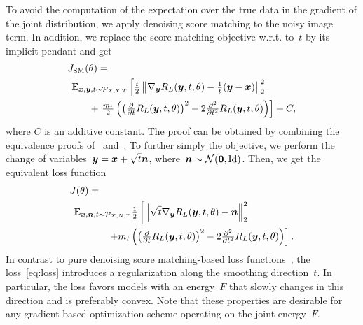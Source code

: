 \documentclass[nohyperref]{article}
\newcommand{\id}{\mathrm{Id}}
\newcommand{\norm}[1]{\left\Vert#1\right\Vert}
\renewcommand{\vec}[1]{\mathbf{#1}}
\newcommand{\dist}[1]{\mathcal{P}_{#1}}
\theoremstyle{plain}
\theoremstyle{definition}
\theoremstyle{remark}
\begin{document}
To avoid the computation of the expectation over the true data in the gradient of the joint distribution, we apply denoising score matching to the noisy image term.
In addition, we replace the score matching objective w.r.t. to~$t$ by its implicit pendant and get
\begin{align*}
&J_\mathrm{SM}(\theta)=\\
&\hspace{1ex}\E_{\vx,\vy,t\sim\dist{X,Y,T}}\left[\tfrac{t}{2}\norm{\nabla_\vy R_L(\vy,t,\theta) -\tfrac{1}{t}(\vy-\vx)}_2^2 \right.\\
&\hspace{5ex}+ \left. \tfrac{m_t}{2}\left(\left(\tfrac{\partial}{\partial t}R_L(\vy,t,\theta)\right)^2 -2\tfrac{\partial^2}{\partial t^2}R_L(\vy,t,\theta)\right)\right] + C,
\end{align*}
where $C$ is an additive constant.
The proof can be obtained by combining the equivalence proofs of~\citet{Hy05} and~\citet{Vi11}.
To further simply the objective, we perform the change of variables~${\bm{y}}={\bm{x}}+\sqrt{t}{\bm{n}}$, where~$\vn\sim\mathcal{N}(\vec{0},\id)$.
Then, we get the equivalent loss function
\begin{align} \label{eq:loss}
&J(\theta)=\\
&\hspace{1ex}\E_{\vx,\vn,t\sim\dist{X,N,T}}\tfrac{1}{2}\left[\norm{\sqrt{t}\nabla_\vy R_L(\vy,t,\theta) -\vn}_2^2\right. \notag\\ 
&\hspace{9ex}\left.+m_t\left(\left(\tfrac{\partial}{\partial t}R_L(\vy,t,\theta)\right)^2 -2\tfrac{\partial^2}{\partial t^2}R_L(\vy,t,\theta)\right)\right]. \notag
\end{align}
In contrast to pure denoising score matching-based loss functions~\citep{SoEr19,HoJa20}, the loss~\eqref{eq:loss} introduces a regularization along the smoothing direction~$t$.
In particular, the loss favors models with an energy~$F$ that slowly changes in this direction and is preferably convex.
Note that these properties are desirable for any gradient-based optimization scheme operating on the joint energy~$F$.
\end{document}
